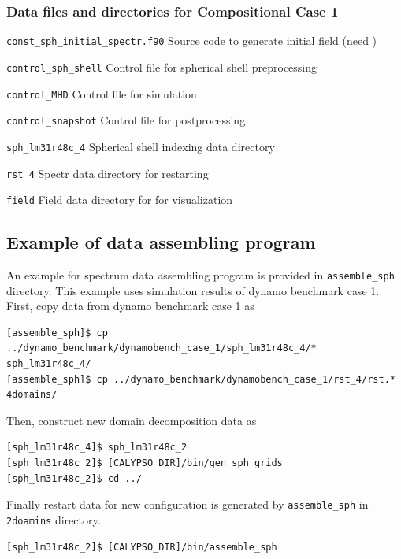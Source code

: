 \subsubsection{Data files and directories for Compositional Case 1}
\label{section:bench_case1C}
%
\begin{description}
\item{\tt const\_sph\_initial\_spectr.f90}	Source code to generate initial field (need )
\item{\tt control\_sph\_shell}	Control file for spherical shell preprocessing
\item{\tt control\_MHD}		Control file for simulation
\item{\tt control\_snapshot}	Control file for postprocessing
\item{\tt sph\_lm31r48c\_4} 	Spherical shell indexing data directory
\item{\tt rst\_4}				Spectr data directory for restarting
\item{\tt field}				Field data directory for for visualization
\end{description}
%

\subsection{Example of data assembling program}
An example for spectrum data assembling program is provided in \verb|assemble_sph| directory. This example uses simulation results of dynamo benchmark case 1.
First, copy data from dynamo benchmark case 1 as
%
\begin{verbatim}
[assemble_sph]$ cp ../dynamo_benchmark/dynamobench_case_1/sph_lm31r48c_4/* sph_lm31r48c_4/
[assemble_sph]$ cp ../dynamo_benchmark/dynamobench_case_1/rst_4/rst.* 4domains/
\end{verbatim}

Then, construct new domain decomposition data as 
%
\begin{verbatim}
[sph_lm31r48c_4]$ sph_lm31r48c_2
[sph_lm31r48c_2]$ [CALYPSO_DIR]/bin/gen_sph_grids
[sph_lm31r48c_2]$ cd ../
\end{verbatim}

Finally restart data for new configuration is generated by \verb|assemble_sph| in \verb|2doamins| directory.
\begin{verbatim}
[sph_lm31r48c_2]$ [CALYPSO_DIR]/bin/assemble_sph
\end{verbatim}



